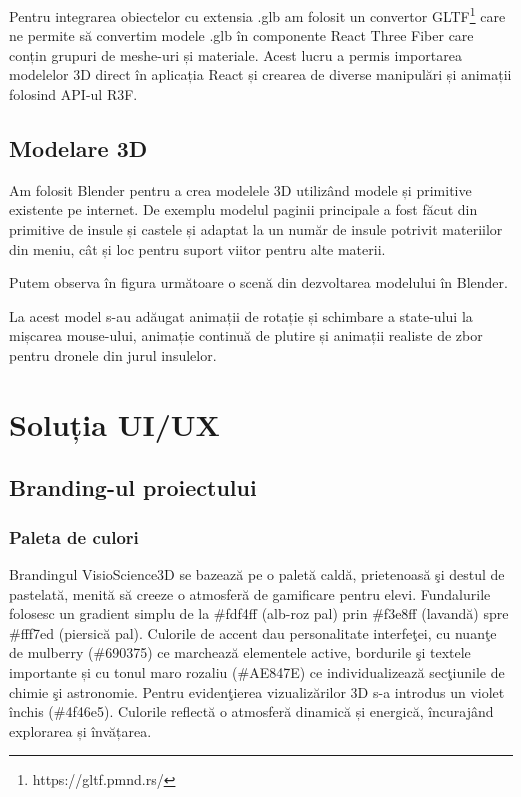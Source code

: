 Pentru integrarea obiectelor cu extensia .glb am folosit un convertor GLTF\footnote{https://gltf.pmnd.rs/} care
ne permite să convertim modele .glb în componente React Three Fiber care conțin grupuri de meshe-uri și
materiale. Acest lucru a permis importarea modelelor 3D direct în aplicația React și crearea de 
diverse manipulări și animații folosind API-ul R3F.




\subsection{Modelare 3D}
Am folosit Blender pentru a crea modelele 3D utilizând modele și primitive existente pe internet. De exemplu
modelul paginii principale a fost făcut din primitive de insule și castele și adaptat la un număr de 
insule potrivit materiilor din meniu, cât și loc pentru suport viitor pentru alte materii. 

Putem observa în figura următoare o scenă din dezvoltarea modelului în Blender.


La acest model s-au adăugat animații de rotație și schimbare a state-ului la mișcarea mouse-ului,
animație continuă de plutire și animații realiste de zbor pentru dronele din jurul insulelor.


\section{Soluția UI/UX}
\label{sub-sec:proj-ui-ux}
\subsection{Branding-ul proiectului}
\subsubsection{Paleta de culori}
Brandingul VisioScience3D se bazează pe o paletă caldă, prietenoasă şi destul de pastelată,
menită să creeze o atmosferă de gamificare pentru elevi. Fundalurile folosesc un gradient
simplu de la \#fdf4ff (alb-roz pal) prin \#f3e8ff (lavandă) spre \#fff7ed (piersică pal).
Culorile de accent dau personalitate interfeţei, cu nuanţe de mulberry (\#690375) ce
marchează elementele active, bordurile şi textele importante și cu tonul maro rozaliu (\#AE847E) ce 
individualizează secţiunile de chimie şi astronomie. Pentru evidenţierea vizualizărilor 3D
s-a introdus un violet închis (\#4f46e5). Culorile reflectă o atmosferă dinamică și 
energică, încurajând explorarea și învățarea.

